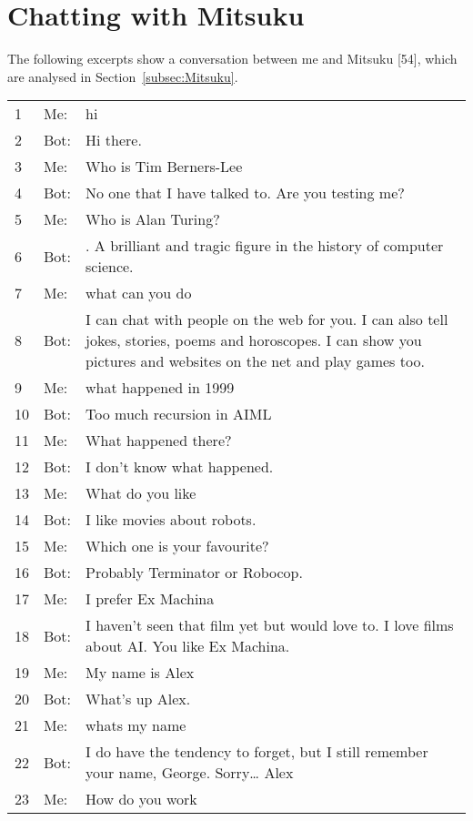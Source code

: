 \chapter{Chatting with Mitsuku}
\label{app:mitsuku}
The following excerpts show a conversation between me and Mitsuku [54], which are analysed in Section~\ref{subsec:Mitsuku}.
\renewcommand*{\arraystretch}{1.1}
\begin{longtable}{@{}p{} p{}  p{}@{}}
	\toprule
	1 & Me: & hi \\ 
	2 & Bot: & Hi there. \\ 
	3 & Me: & Who is Tim Berners-Lee \\ 
	4 & Bot: & No one that I have talked to. Are you testing me? \\ 
	5 & Me: & Who is Alan Turing? \\ 
	6 & Bot: & . A brilliant and tragic figure in the history of computer science. \\ 
	7 & Me: & what can you do \\ 
	8 & Bot: & I can chat with people on the web for you. I can also tell jokes, stories, poems and horoscopes. I can show you pictures and websites on the net and play games too. \\ 
	9 & Me: & what happened in 1999 \\ 
	10 & Bot: & Too much recursion in AIML \\ 
	11 & Me: & What happened there? \\ 
	12 & Bot: & I don't know what happened. \\ 
	13 & Me: & What do you like \\ 
	14 & Bot: & I like movies about robots. \\ 
	15 & Me: & Which one is your favourite? \\ 
	16 & Bot: & Probably Terminator or Robocop. \\ 
	17 & Me: & I prefer Ex Machina \\ 
	18 & Bot: & I haven't seen that film yet but would love to. I love films about AI. You like Ex Machina. \\ 
	19 & Me: & My name is Alex \\ 
	20 & Bot: & What's up Alex. \\ 
	21 & Me: & whats my name \\ 
	22 & Bot: & I do have the tendency to forget, but I still remember your name, George. Sorry… Alex \\ 
	23 & Me: & How do you work \\ 

\end{longtable}
